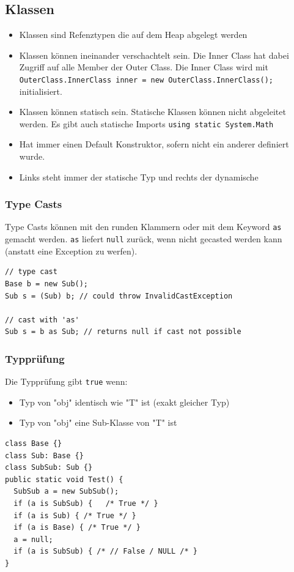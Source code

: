 \documentclass[
a4paper,
oneside,
10pt,
fleqn,
headsepline,
toc=listofnumbered, 
bibliography=totocnumbered]{scrartcl}
\begin{document}
\subsection{Klassen}
\begin{itemize}
	\item Klassen sind Refenztypen die auf dem Heap abgelegt werden
	\item Klassen können ineinander verschachtelt sein. Die Inner Class hat dabei Zugriff auf alle Member der Outer Class. Die Inner Class wird mit \lstinline|OuterClass.InnerClass inner = new OuterClass.InnerClass();| initialisiert.
	\item Klassen können statisch sein. Statische Klassen können nicht abgeleitet werden. Es gibt auch statische Imports \lstinline|using static System.Math|
	\item Hat immer einen Default Konstruktor, sofern nicht ein anderer definiert wurde.
	\item Links steht immer der statische Typ und rechts der dynamische
\end{itemize}

\subsubsection{Type Casts}
Type Casts können mit den runden Klammern oder mit dem Keyword \lstinline|as| gemacht werden. \lstinline|as| liefert \lstinline|null| zurück, wenn nicht gecasted werden kann (anstatt eine Exception zu werfen).
\begin{lstlisting}
// type cast
Base b = new Sub();
Sub s = (Sub) b; // could throw InvalidCastException

// cast with 'as'
Sub s = b as Sub; // returns null if cast not possible

\end{lstlisting}

\subsubsection{Typprüfung}
Die Typprüfung gibt \lstinline|true| wenn:
\begin{itemize}
	\item Typ von "obj" identisch wie "T" ist (exakt gleicher Typ)
	\item Typ von "obj" eine Sub-Klasse von "T" ist
\end{itemize}
\begin{lstlisting}
class Base {}
class Sub: Base {}
class SubSub: Sub {}
public static void Test() {
  SubSub a = new SubSub();
  if (a is SubSub) {   /* True */ }
  if (a is Sub) { /* True */ } 
  if (a is Base) { /* True */ }
  a = null; 
  if (a is SubSub) { /* // False / NULL /* } 
} 
\end{lstlisting}
\end{document}
